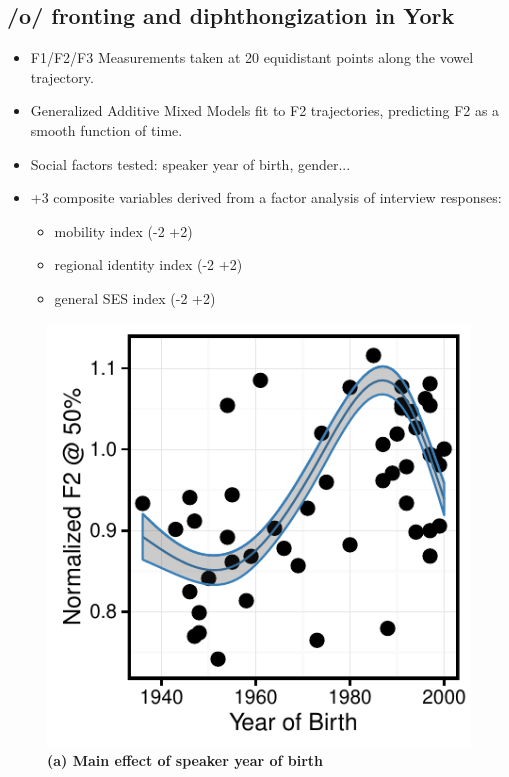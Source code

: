 \documentclass[a0,final]{a0poster}
\begin{document}
\begin{multicols*}{4}
\section*{/o/ fronting and diphthongization in York}
\begin{itemize}
\item{F1/F2/F3 Measurements taken at 20 equidistant points along the vowel trajectory.}
\item{Generalized Additive Mixed Models fit to F2 trajectories, predicting F2 as a smooth function of time.}
\item{Social factors tested: speaker year of birth, gender...}
\item{+3 composite variables derived from a factor analysis of interview responses:\begin{itemize}\item{
mobility index (-2 +2)} \item{regional identity index (-2 +2)} \item{general SES index (-2 +2)}\end{itemize}}
\end{itemize}
\begin{minipage}{0.15\textwidth}
\raggedright
\begin{figure}[H]
\includegraphics[scale=1.6]{o_fronting_scurve.pdf}
\caption*{\textbf{(a) Main effect of speaker year of birth}}
\end{figure}
\end{minipage}

\end{multicols*}
\end{document}
